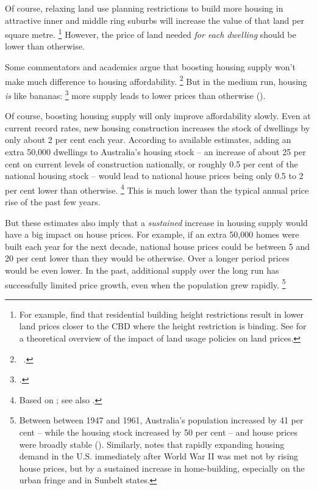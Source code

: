 Of course, relaxing land use planning restrictions to build more housing in attractive inner and middle ring suburbs will increase the value of that land per square metre.%
    \footnote{For example, \textcite[][11]{KulishRichardsGillitzer2011} find that residential building height restrictions result in lower land prices closer to the CBD where the height restriction is binding.
    See \textcite{Brueckner2007} for a theoretical overview of the impact of land usage policies on land prices.}
However, the price of land needed \textit{for each dwelling} should be lower than otherwise. 

Some commentators and academics argue that boosting housing supply won't make much difference to housing affordability.%
	\footnote{\eg~\textcites{RowleyGurranPhibbs-2017-worldleaderhomebuilding}{Pawson-2017-theConvo-To-do-list-for-NSW-Premier}.}
But in the medium run, housing \textit{is} like bananas:%
    \footcite{Gurran_Phibbs_2014_bananas_conversation}
more supply leads to lower prices than otherwise ().

Of course, boosting housing supply will only improve affordability slowly. Even at current record rates, new housing construction increases the stock of dwellings by only about 2 per cent each year. According to available estimates, adding an extra 50,000 dwellings to Australia's housing stock -- an increase of about 25 per cent on current levels of construction nationally, or roughly 0.5 per cent of the national housing stock -- would lead to national house prices being only 0.5 to 2 per cent lower than otherwise.%
	\footnote{Based on \textcites{Abelson-2016-Housing-costs-policies}{Albouy-2016-housing-demand}{barkerinterim2003}; see also .}
This is much lower than the typical annual price rise of the past few years.

But these estimates also imply that a \emph{sustained} increase in housing supply would have a big impact on house prices.
For example, if an extra 50,000 homes were built each year for the next decade, national house prices could be between 5 and 20 per cent lower than they would be otherwise. Over a longer period prices would be even lower. 
In the past, additional supply over the long run has successfully limited price growth, even when the population grew rapidly.%
    \footnote{Between between 1947 and 1961, Australia’s population increased by 41 per cent -- while the housing stock increased by 50 per cent -- and house prices were broadly stable (\textcite{Eslake2013}).
    Similarly, \textcite[][31--32]{Glaeser-2013-Natio-of-gamblers} notes that rapidly expanding housing demand in the U.S. immediately after World War II was met not by rising house prices, but by a sustained increase in home-building, especially on the urban fringe and in Sunbelt states.}

